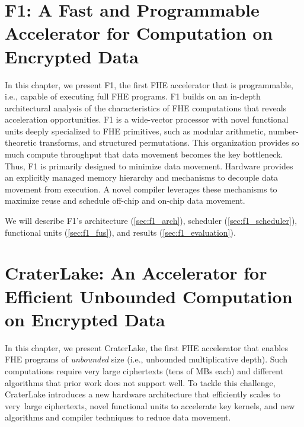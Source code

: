 \documentclass[12pt,twoside]{mitthesis}
\begin{document}


\pagestyle{plain}





\chapter{F1: A Fast and Programmable Accelerator for Computation on Encrypted Data}

In this chapter, we present F1, the first FHE accelerator that is
programm\-able, i.e., capable of executing full FHE programs. F1 builds on an
in-depth architectural analysis of the characteristics of FHE computations that
reveals acceleration opportunities. F1 is a wide-vector processor with novel
functional units deeply specialized to FHE primitives, such as modular
arithmetic, number-theoretic transforms, and structured permutations. This
organization provides so much compute throughput that data movement becomes the
key bottleneck. Thus, F1 is primarily designed to minimize data movement.
Hardware provides an explicitly managed memory hierarchy and mechanisms to
decouple data movement from execution. A novel compiler leverages these
mechanisms to maximize reuse and schedule off-chip and on-chip data movement.

We will describe F1's architecture (\autoref{sec:f1_arch}), scheduler
(\autoref{sec:f1_scheduler}), functional units (\autoref{sec:f1_fus}), and
results (\autoref{sec:f1_evaluation}).





\let\cleardoublepage\clearpage %

\chapter{CraterLake: An Accelerator for Efficient Unbounded Computation on Encrypted Data}\label{ch:craterlake}

In this chapter, we present CraterLake, the first FHE accelerator that enables
FHE programs of \emph{unbounded} size (i.e., unbounded multiplicative depth).
Such computations require very large ciphertexts (tens of MBs each) and
different algorithms that prior work does not support well. To tackle this
challenge, CraterLake introduces a new hardware architecture that efficiently
scales to very~large ciphertexts, novel functional units to accelerate key
kernels, and new algorithms and compiler techniques to reduce data movement.
\end{document}
